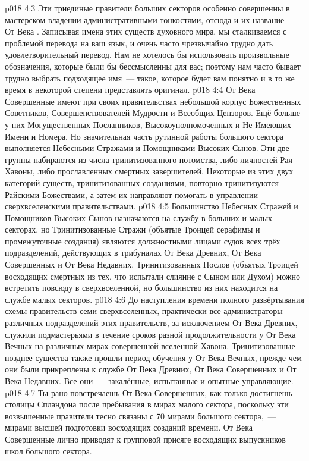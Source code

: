 \vs p018 4:3 \pc Эти триединые правители больших секторов особенно совершенны в мастерском владении административными тонкостями, отсюда и их название~--- От Века . Записывая имена этих существ духовного мира, мы сталкиваемся с проблемой перевода на ваш язык, и очень часто чрезвычайно трудно дать удовлетворительный перевод. Нам не хотелось бы использовать произвольные обозначения, которые были бы бессмысленны для вас; поэтому нам часто бывает трудно выбрать подходящее имя~--- такое, которое будет вам понятно и в то же время в некоторой степени представлять оригинал.
\vs p018 4:4 \pc От Века Совершенные имеют при своих правительствах небольшой корпус Божественных Советников, Совершенствователей Мудрости и Всеобщих Цензоров. Ещё больше у них Могущественных Посланников, Высокоуполномоченных и Не Имеющих Имени и Номера. Но значительная часть рутинной работы большого сектора выполняется Небесными Стражами и Помощниками Высоких Сынов. Эти две группы набираются из числа тринитизованного потомства, либо личностей Рая\hyp{}Хавоны, либо прославленных смертных завершителей. Некоторые из этих двух категорий существ, тринитизованных созданиями, повторно тринитизуются Райскими Божествами, а затем их направляют помогать в управлении сверхвселенскими правительствами.
\vs p018 4:5 Большинство Небесных Стражей и Помощников Высоких Сынов назначаются на службу в больших и малых секторах, но Тринитизованные Стражи (объятые Троицей серафимы и промежуточные создания) являются должностными лицами судов всех трёх подразделений, действующих в трибуналах От Века Древних, От Века Совершенных и От Века Недавних. Тринитизованных Послов (объятых Троицей восходящих смертных из тех, что испытали слияние с Сыном или Духом) можно встретить повсюду в сверхвселенной, но большинство из них находится на службе малых секторов.
\vs p018 4:6 До наступления времени полного развёртывания схемы правительств семи сверхвселенных, практически все администраторы различных подразделений этих правительств, за исключением От Века Древних, служили подмастерьями в течение сроков разной продолжительности у От Века Вечных на различных мирах совершенной вселенной Хавона. Тринитизованные позднее существа также прошли период обучения у От Века Вечных, прежде чем они были прикреплены к службе От Века Древних, От Века Совершенных и От Века Недавних. Все они~--- закалённые, испытанные и опытные управляющие.
\vs p018 4:7 \pc Ты рано повстречаешь От Века Совершенных, как только достигнешь столицы Спландона после пребывания в мирах малого сектора, поскольку эти возвышенные правители тесно связаны с 70 мирами большого сектора,~--- мирами высшей подготовки восходящих созданий времени. От Века Совершенные лично приводят к групповой присяге восходящих выпускников школ большого сектора.
